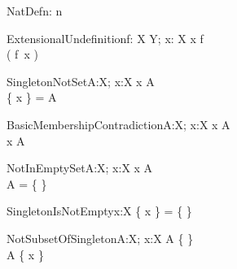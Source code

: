 \begin{theorem}{NatDef}{n: \nat}
 \leq n
\end{theorem}


\begin{theorem}{ExtensionalUndefinition}{f: X \pfun Y; x: X}
x \notin \dom f \\
\sw( f~x ) \\
\end{theorem}





\begin{theorem}{SingletonNotSet}{A:\power X; x:X}
x \notin A \\
\{ x \} = A
\end{theorem}

\begin{theorem}{BasicMembershipContradiction}{A:\power X; x:X}
x \in A \\
x \notin A
\end{theorem}

\begin{theorem}{NotInEmptySet}{A:\power X; x:X}
x \in A \\
A = \{ \}
\end{theorem}

\begin{theorem}{SingletonIsNotEmpty}{x:X}
\{ x \} = \{ \}
\end{theorem}

\begin{theorem}{NotSubsetOfSingleton}{A:\power X; x:X}
A \neq \{ \} \\
A \subset \{ x \} 
\end{theorem}

